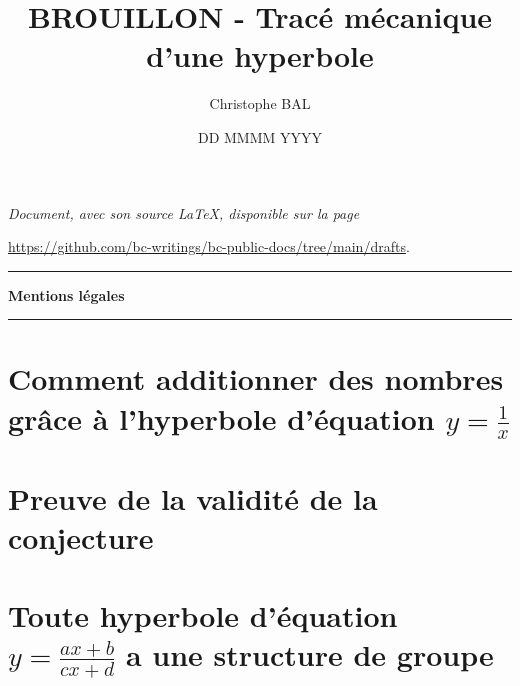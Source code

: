 \documentclass[12pt]{amsart}
\begin{document}
\title{BROUILLON - Tracé mécanique d'une hyperbole}
\author{Christophe BAL}
\date{DD MMMM YYYY}
\maketitle


\begin{center}
	\itshape
	Document, avec son source \LaTeX, disponible sur la page

	\url{https://github.com/bc-writings/bc-public-docs/tree/main/drafts}.
\end{center}


\bigskip


\begin{center}
	\hrule\vspace{.3em}
	{
		\fontsize{1.35em}{1em}\selectfont
		\textbf{Mentions \og légales \fg}
	}

	\vspace{0.45em}
	\doclicenseThis
	\hrule
\end{center}



\setcounter{tocdepth}{2}
\tableofcontents




\newpage

\section{\texorpdfstring{Comment additionner des nombres grâce à l'hyperbole d'équation $y = \frac{1}{x}$}%
                        {Comment additionner des nombres grâce à l'hyperbole d'équation y = 1/x}}





\section{Preuve de la validité de la conjecture} \label{proof}





\section{\texorpdfstring{Toute hyperbole d'équation $y = \frac{a x + b}{c x + d}$ a une structure de groupe}%
                        {Toute hyperbole d'équation y = (a x + b) / (c x + d) a une structure de groupe}}





\end{document}
